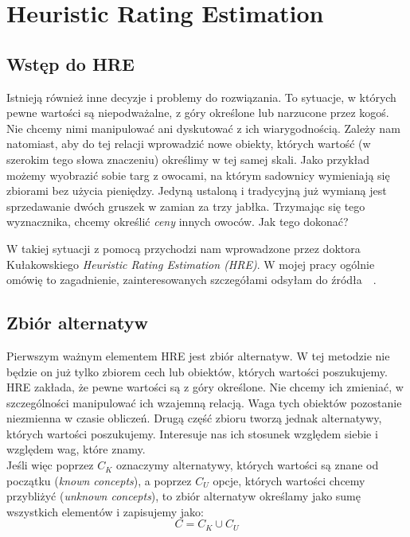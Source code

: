 
\chapter{Heuristic Rating Estimation}
\label{sec:HRE}

\section{Wstęp do HRE}
\label{subsec:wstepHRE}
Istnieją również inne decyzje i problemy do rozwiązania. To sytuacje, w których pewne wartości są niepodważalne, z góry określone lub narzucone przez kogoś. Nie chcemy nimi manipulować ani dyskutować z ich wiarygodnością. Zależy nam natomiast, aby do tej relacji wprowadzić nowe obiekty, których wartość (w szerokim tego słowa znaczeniu) określimy w tej samej skali. Jako przykład możemy wyobrazić sobie targ z owocami, na którym sadownicy wymieniają się zbiorami bez użycia pieniędzy. Jedyną ustaloną i tradycyjną już wymianą jest sprzedawanie dwóch gruszek w zamian za trzy jabłka. Trzymając się tego wyznacznika, chcemy określić \textit{ceny} innych owoców. Jak tego dokonać? 

W takiej sytuacji z pomocą przychodzi nam wprowadzone przez doktora Kułakowskiego \textit{Heuristic Rating Estimation (HRE)}.
W mojej pracy ogólnie omówię to zagadnienie, zainteresowanych szczegółami odsyłam do źródła~\cite{A2}~\cite{A3}.

\section{Zbiór alternatyw}
\label{subsec:zbiorAlternatyw}
Pierwszym ważnym elementem HRE jest zbiór alternatyw. W tej metodzie nie będzie on już tylko zbiorem cech lub obiektów, których wartości poszukujemy. HRE zakłada, że pewne wartości są z góry określone. Nie chcemy ich zmieniać, w szczególności manipulować ich wzajemną relacją. Waga tych obiektów pozostanie niezmienna w czasie obliczeń. Drugą część zbioru tworzą jednak alternatywy, których wartości poszukujemy. Interesuje nas ich stosunek względem siebie i względem wag, które znamy.\\ 
    Jeśli więc poprzez $C_{K}$ oznaczymy alternatywy, których wartości są znane od początku (\textit{known concepts}), a poprzez $C_{U}$ opcje, których wartości chcemy przybliżyć (\textit{unknown concepts}), to zbiór alternatyw określamy jako sumę wszystkich elementów i zapisujemy jako:
$$C = C_{K} \cup C_{U}$$

